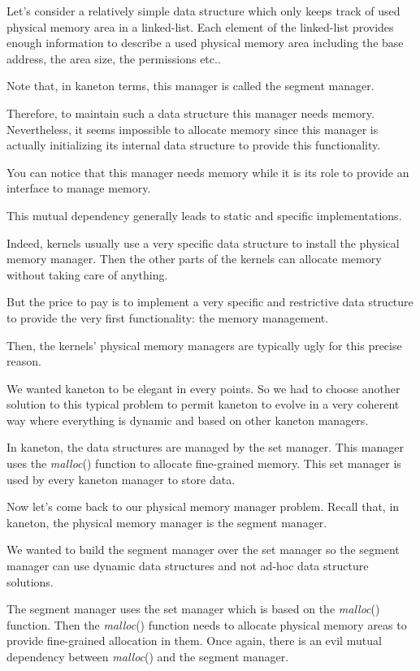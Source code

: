 Let's consider a relatively simple data structure which only keeps track
of used physical memory area in a linked-list. Each element of the
linked-list provides enough information to describe a used physical memory
area including the base address, the area size, the permissions etc..

Note that, in kaneton terms, this manager is called the segment manager.

Therefore, to maintain such a data structure this manager needs memory.
Nevertheless, it seems impossible to allocate memory since this manager
is actually initializing its internal data structure to provide this
functionality.

You can notice that this manager needs memory while it is its role to provide
an interface to manage memory.

This mutual dependency generally leads to static and specific implementations.

Indeed, kernels usually use a very specific data structure to install
the physical memory manager. Then the other parts of the kernels can allocate
memory without taking care of anything.

But the price to pay is to implement a very specific and restrictive
data structure to provide the very first functionality: the memory management.

Then, the kernels' physical memory managers are typically ugly for this
precise reason.

We wanted kaneton to be elegant in every points. So we had to choose another
solution to this typical problem to permit kaneton to evolve in a very
coherent way where everything is dynamic and based on other kaneton
managers.

In kaneton, the data structures are managed by the set manager. This
manager uses the \textit{malloc}() function to allocate fine-grained memory.
This set manager is used by every kaneton manager to store data.

Now let's come back to our physical memory manager problem. Recall that, in
kaneton, the physical memory manager is the segment manager.

We wanted to build the segment manager over the set manager so the segment
manager can use dynamic data structures and not ad-hoc data structure
solutions.

The segment manager uses the set manager which is based on the
\textit{malloc}() function. Then the \textit{malloc}() function needs to
allocate physical memory areas to provide fine-grained allocation in them.
Once again, there is an evil mutual dependency between \textit{malloc}()
and the segment manager.

